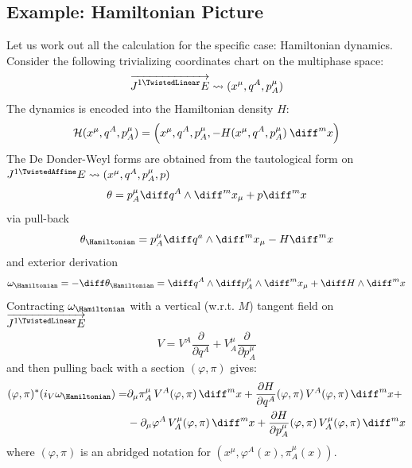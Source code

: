 \documentclass[a4paper,12pt,fleqn]{scrartcl}  %
\renewcommand{\AffDualJet}{ J^{1 \TwistedAffine}E }
\renewcommand{\LinDualJet}{ \overrightarrow{J^{1 \TwistedLinear}E} }
\begin{document}
\subsection{Example: Hamiltonian Picture}
Let us work out all the calculation for the specific case: Hamiltonian dynamics.\\
Consider the following trivializing coordinates chart on the multiphase space:
\begin{displaymath}
	\LinDualJet \rightsquigarrow (x^\mu, q^A, p^\mu_A)
\end{displaymath}
%
The dynamics is encoded into the Hamiltonian density $H$:
\begin{displaymath}
	\mathcal{H}(x^\mu, q^A, p^\mu_A) = 
	\left(x^\mu, q^A, p^\mu_A, - H( x^\mu, q^A, p^\mu_A) \: \diff^m x \right)
\end{displaymath}
%
The De Donder-Weyl forms are obtained from the tautological form on $\AffDualJet \rightsquigarrow (x^\mu, q^A, p^\mu_A, p)$
\begin{displaymath}
	\theta = p^\mu_A \diff q^A \wedge \diff^m x_\mu + p \diff^m x
\end{displaymath}
via pull-back
\begin{displaymath}
	\theta_\Hamiltonian = p^\mu_A \diff q^a \wedge \diff^m x_\mu - H \diff^m x
\end{displaymath}
and exterior derivation
\begin{displaymath}
	\omega_\Hamiltonian = -\diff \theta_\Hamiltonian = \diff q^A \wedge \diff p^\mu_A \wedge \diff^m x_\mu + \diff H \wedge \diff^m x 
\end{displaymath}
%
Contracting $\omega_\Hamiltonian$ with a vertical (w.r.t. $M$) tangent field on $\LinDualJet$
\begin{displaymath}
	V = V^A \dfrac{\partial}{\partial q^A} +
			V^\mu_A \dfrac{\partial}{\partial p^\mu_A}
\end{displaymath}
and then pulling back with a section $(\varphi,\pi)$ gives:
\begin{align*}
	(\varphi , \pi)^\ast (i_V \omega_\Hamiltonian ) = & 
	\partial_\mu \pi^\mu_A \, V^A(\varphi,\pi) \, \diff^m x 
	+ \frac{\partial H}{\partial q^A} (\varphi,\pi) \, V^A(\varphi,\pi) \, \diff^m x + \\
	 & - \partial_\mu \varphi^A \, V^\mu_A(\varphi,\pi) \, \diff^m x +
	\frac{\partial H}{\partial p^\mu_A} (\varphi,\pi) \, V^\mu_A(\varphi,\pi) \, \diff^m x
\end{align*}
where $(\varphi, \pi)$ is an abridged notation for $\left(x^\mu, \varphi^A(x), \pi^\mu_A(x)\right)$.
\end{document}
